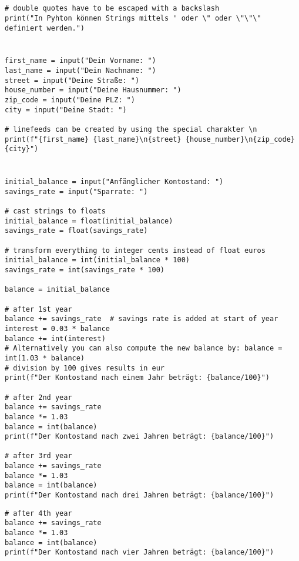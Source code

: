 \documentclass[a4paper]{article}
\begin{document}




\section{}
\begin{verbatim}
# double quotes have to be escaped with a backslash
print("In Pyhton können Strings mittels ' oder \" oder \"\"\" definiert werden.")
\end{verbatim}

\section{}
\begin{verbatim}
first_name = input("Dein Vorname: ")
last_name = input("Dein Nachname: ")
street = input("Deine Straße: ")
house_number = input("Deine Hausnummer: ")
zip_code = input("Deine PLZ: ")
city = input("Deine Stadt: ")

# linefeeds can be created by using the special charakter \n
print(f"{first_name} {last_name}\n{street} {house_number}\n{zip_code} {city}")
\end{verbatim}


\section{} 
\begin{verbatim}
initial_balance = input("Anfänglicher Kontostand: ")
savings_rate = input("Sparrate: ")

# cast strings to floats
initial_balance = float(initial_balance)
savings_rate = float(savings_rate)

# transform everything to integer cents instead of float euros
initial_balance = int(initial_balance * 100)
savings_rate = int(savings_rate * 100)

balance = initial_balance

# after 1st year
balance += savings_rate  # savings rate is added at start of year
interest = 0.03 * balance
balance += int(interest)
# Alternatively you can also compute the new balance by: balance = int(1.03 * balance)
# division by 100 gives results in eur
print(f"Der Kontostand nach einem Jahr beträgt: {balance/100}")

# after 2nd year
balance += savings_rate
balance *= 1.03
balance = int(balance)
print(f"Der Kontostand nach zwei Jahren beträgt: {balance/100}")

# after 3rd year
balance += savings_rate
balance *= 1.03
balance = int(balance)
print(f"Der Kontostand nach drei Jahren beträgt: {balance/100}")
\end{verbatim}
\newpage
\begin{verbatim}
# after 4th year
balance += savings_rate
balance *= 1.03
balance = int(balance)
print(f"Der Kontostand nach vier Jahren beträgt: {balance/100}")
\end{verbatim}
\end{document}

